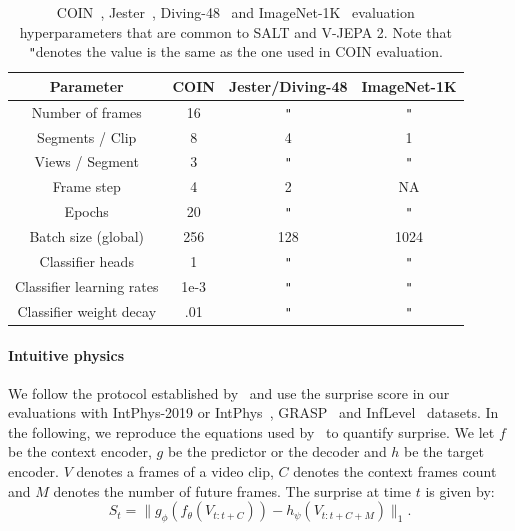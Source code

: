 \documentclass{applemlr}
\numberwithin{equation}{section}
\newcommand{\ourmethod}{SALT\xspace}
\newcommand{\ditto}{\texttt{"}}
\begin{document}
\begin{table}[htbp]
\centering
\caption{COIN~\citep{tang2019coin}, Jester~\citep{jester_materzynska2019}, Diving-48~\citep{diving48_Li_2018_ECCV} and ImageNet-1K~\citep{imagenet_russakovsky2015} evaluation hyperparameters that are common to \ourmethod and V-JEPA 2. Note that \ditto denotes the value is the same as the one used in COIN evaluation.}
\label{tab:appendix:eval:hparams:coin_diving_jester_in1k}
\begin{tabular}{cccc}
\toprule
Parameter & COIN & Jester/Diving-48 & ImageNet-1K \\ 
\midrule
Number of frames & 16 & \ditto & \ditto \\ 
Segments / Clip  & 8  &  4     & 1 \\ 
Views / Segment  & 3  & \ditto & \ditto \\ 
Frame step & 4 & 2 & NA \\ 
Epochs & 20 & \ditto & \ditto \\ 
Batch size (global) & 256 & 128 & 1024 \\ 
Classifier heads & 1 & \ditto & \ditto \\ 
Classifier learning rates & 1e-3 & \ditto & \ditto \\ 
Classifier weight decay & .01 & \ditto & \ditto \\ 
\bottomrule
\end{tabular}
\end{table}

\paragraph{Intuitive physics}

We follow the protocol established by~\citet{garrido2025intuitive} and use the surprise score in our evaluations with IntPhys-2019 or IntPhys~\citep{riochet2018intphys}, GRASP~\citep{jassim2023grasp} and InfLevel~\citep{weihs_inflevel} datasets. In the following, we reproduce the equations used by~\citet{garrido2025intuitive} to quantify surprise. We let $f$ be the context encoder, $g$ be the predictor or the decoder and $h$ be the target encoder. $V$ denotes a frames of a video clip, $C$ denotes the context frames count and $M$ denotes the number of future frames. The surprise at time $t$ is given by:
\begin{equation}
S_t = \| g_\phi \left( f_\theta \left( V_{t:t+C} \right) \right) - h_\psi \left( V_{t:t+C+M} \right) \|_1.
\end{equation}
\end{document}
